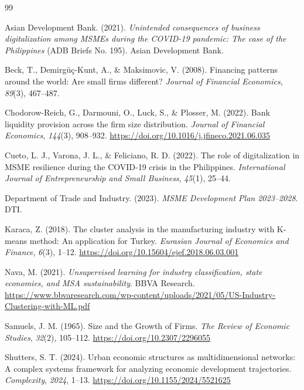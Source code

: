 \documentclass[acmtog, nonacm]{acmart}
\begin{document}
\begin{thebibliography}{99}

Asian Development Bank. (2021). \textit{Unintended consequences of business digitalization among MSMEs during the COVID-19 pandemic: The case of the Philippines} (ADB Briefs No. 195). Asian Development Bank.

Beck, T., Demirgüç-Kunt, A., \& Maksimovic, V. (2008). Financing patterns around the world: Are small firms different? \textit{Journal of Financial Economics}, \textit{89}(3), 467--487.

Chodorow-Reich, G., Darmouni, O., Luck, S., \& Plosser, M. (2022). Bank liquidity provision across the firm size distribution. \textit{Journal of Financial Economics}, \textit{144}(3), 908--932. \url{https://doi.org/10.1016/j.jfineco.2021.06.035}

Cueto, L. J., Varona, J. L., \& Feliciano, R. D. (2022). The role of digitalization in MSME resilience during the COVID-19 crisis in the Philippines. \textit{International Journal of Entrepreneurship and Small Business}, \textit{45}(1), 25–44.

Department of Trade and Industry. (2023). \textit{MSME Development Plan 2023–2028}. DTI.

Karaca, Z. (2018). The cluster analysis in the manufacturing industry with K-means method: An application for Turkey. \textit{Eurasian Journal of Economics and Finance}, \textit{6}(3), 1–12. \url{https://doi.org/10.15604/ejef.2018.06.03.001}

Nava, M. (2021). \textit{Unsupervised learning for industry classification, state economies, and MSA sustainability}. BBVA Research. \url{https://www.bbvaresearch.com/wp-content/uploads/2021/05/US-Industry-Clustering-with-ML.pdf}

Samuels, J. M. (1965). Size and the Growth of Firms. \textit{The Review of Economic Studies}, \textit{32}(2), 105–112. \url{https://doi.org/10.2307/2296055}

Shutters, S. T. (2024). Urban economic structures as multidimensional networks: A complex systems framework for analyzing economic development trajectories. \textit{Complexity}, \textit{2024}, 1–13. \url{https://doi.org/10.1155/2024/5521625}


\end{thebibliography}
\end{document}
